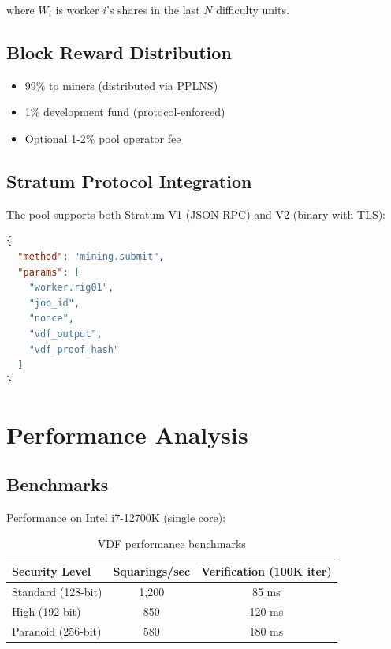 \documentclass[11pt,a4paper]{article}
\begin{document}
where $W_i$ is worker $i$'s shares in the last $N$ difficulty units.

\subsection{Block Reward Distribution}

\begin{itemize}
    \item 99\% to miners (distributed via PPLNS)
    \item 1\% development fund (protocol-enforced)
    \item Optional 1-2\% pool operator fee
\end{itemize}

\subsection{Stratum Protocol Integration}

The pool supports both Stratum V1 (JSON-RPC) and V2 (binary with TLS):

\begin{lstlisting}[language=json,basicstyle=\ttfamily\small]
{
  "method": "mining.submit",
  "params": [
    "worker.rig01",
    "job_id",
    "nonce",
    "vdf_output",
    "vdf_proof_hash"
  ]
}
\end{lstlisting}

\section{Performance Analysis}

\subsection{Benchmarks}

Performance on Intel i7-12700K (single core):

\begin{table}[h]
\centering
\begin{tabular}{lcc}
\toprule
\textbf{Security Level} & \textbf{Squarings/sec} & \textbf{Verification (100K iter)} \\
\midrule
Standard (128-bit) & 1,200 & 85 ms \\
High (192-bit) & 850 & 120 ms \\
Paranoid (256-bit) & 580 & 180 ms \\
\bottomrule
\end{tabular}
\caption{VDF performance benchmarks}
\end{table}
\end{document}
